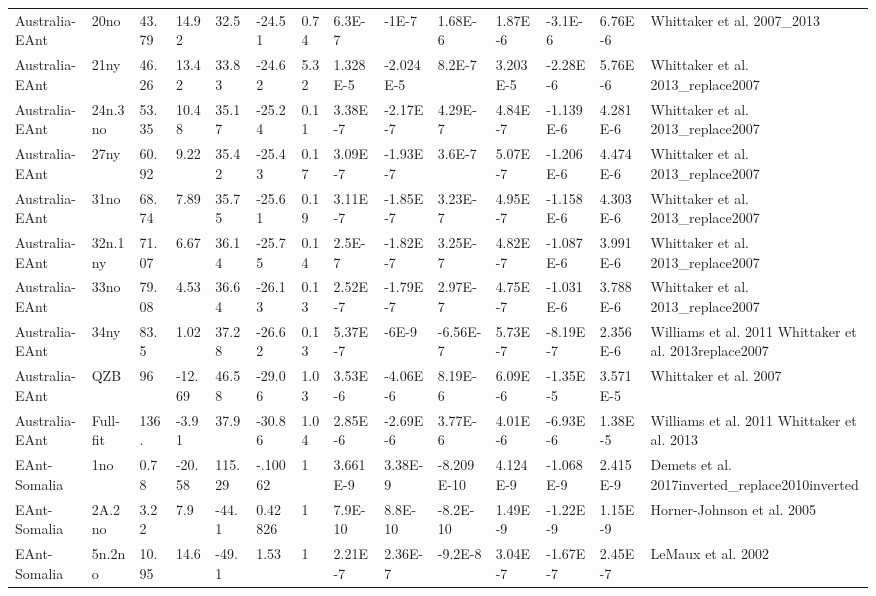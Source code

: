 \begin{landscape}
\begin{longtable}{@{}lllllllllllllp{3.5cm}@{}}
Australia-EAnt & 20no & 43.79 & 14.92 & 32.5 & -24.51 & 0.74 & 6.3E-7 & -1E-7 & 1.68E-6 & 1.87E-6 & -3.1E-6 & 6.76E-6 & Whittaker et al. 2007\_2013 \\
Australia-EAnt & 21ny & 46.26 & 13.42 & 33.83 & -24.62 & 5.32 & 1.328E-5 & -2.024E-5 & 8.2E-7 & 3.203E-5 & -2.28E-6 & 5.76E-6 & Whittaker et al. 2013\_replace2007 \\
Australia-EAnt & 24n.3no & 53.35 & 10.48 & 35.17 & -25.24 & 0.11 & 3.38E-7 & -2.17E-7 & 4.29E-7 & 4.84E-7 & -1.139E-6 & 4.281E-6 & Whittaker et al. 2013\_replace2007 \\
Australia-EAnt & 27ny & 60.92 & 9.22 & 35.42 & -25.43 & 0.17 & 3.09E-7 & -1.93E-7 & 3.6E-7 & 5.07E-7 & -1.206E-6 & 4.474E-6 & Whittaker et al. 2013\_replace2007 \\
Australia-EAnt & 31no & 68.74 & 7.89 & 35.75 & -25.61 & 0.19 & 3.11E-7 & -1.85E-7 & 3.23E-7 & 4.95E-7 & -1.158E-6 & 4.303E-6 & Whittaker et al. 2013\_replace2007 \\
Australia-EAnt & 32n.1ny & 71.07 & 6.67 & 36.14 & -25.75 & 0.14 & 2.5E-7 & -1.82E-7 & 3.25E-7 & 4.82E-7 & -1.087E-6 & 3.991E-6 & Whittaker et al. 2013\_replace2007 \\
Australia-EAnt & 33no & 79.08 & 4.53 & 36.64 & -26.13 & 0.13 & 2.52E-7 & -1.79E-7 & 2.97E-7 & 4.75E-7 & -1.031E-6 & 3.788E-6 & Whittaker et al. 2013\_replace2007 \\
Australia-EAnt & 34ny & 83.5 & 1.02 & 37.28 & -26.62 & 0.13 & 5.37E-7 & -6E-9 & -6.56E-7 & 5.73E-7 & -8.19E-7 & 2.356E-6 & Williams et al. 2011 Whittaker et al. 2013replace2007 \\
Australia-EAnt & QZB & 96 & -12.69 & 46.58 & -29.06 & 1.03 & 3.53E-6 & -4.06E-6 & 8.19E-6 & 6.09E-6 & -1.35E-5 & 3.571E-5 & Whittaker et al. 2007 \\
Australia-EAnt & Full-fit & 136. & -3.91 & 37.9 & -30.86 & 1.04 & 2.85E-6 & -2.69E-6 & 3.77E-6 & 4.01E-6 & -6.93E-6 & 1.38E-5 & Williams et al. 2011 Whittaker et al. 2013 \\
EAnt-Somalia & 1no & 0.78 & -20.58 & 115.29 & -.10062 & 1 & 3.661E-9 & 3.38E-9 & -8.209E-10 & 4.124E-9 & -1.068E-9 & 2.415E-9 & Demets et al. 2017inverted\_replace2010inverted \\
EAnt-Somalia & 2A.2no & 3.22 & 7.9 & -44.1 & 0.42826 & 1 & 7.9E-10 & 8.8E-10 & -8.2E-10 & 1.49E-9 & -1.22E-9 & 1.15E-9 & Horner-Johnson et al. 2005 \\
EAnt-Somalia & 5n.2no & 10.95 & 14.6 & -49.1 & 1.53 & 1 & 2.21E-7 & 2.36E-7 & -9.2E-8 & 3.04E-7 & -1.67E-7 & 2.45E-7 & LeMaux et al. 2002 \\

\end{longtable}
\end{landscape}
